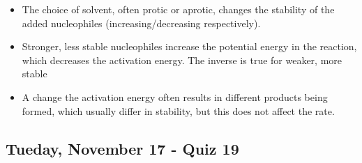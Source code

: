 \documentclass[12pt,a4paper]{article}
\begin{document}
\begin{enumerate}
\begin{itemize}
            \item The choice of solvent, often protic or aprotic, changes the stability of the added nucleophiles (increasing/decreasing respectively). 
            \item Stronger, less stable nucleophiles increase the potential energy in the reaction, which decreases the activation energy. The inverse is true for weaker, more stable 
            \item A change the activation energy often results in different products being formed, which usually differ in stability, but this does not affect the rate.
        \end{itemize}
\end{enumerate}

\newpage
{}
\subsection{Tueday, November 17 - Quiz 19}
\end{document}
